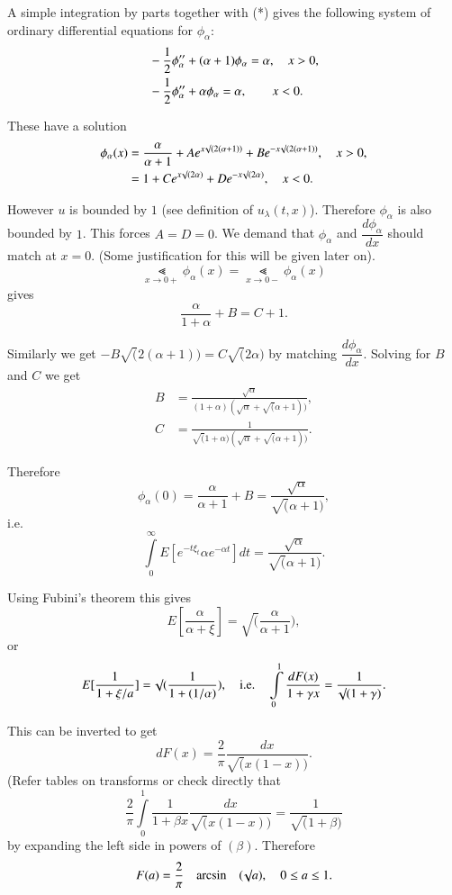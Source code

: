 A simple integration by parts together with (*) gives the following
system of ordinary differential equations for $\phi_{\alpha}$:
\begin{align*}
& -\frac{1}{2}\phi''_{\alpha}+(\alpha+1)\phi_{\alpha}=\alpha,\quad x>0,\\
&-\frac{1}{2}\phi''_{\alpha}+\alpha\phi_{\alpha}=\alpha,\qquad x<0.
\end{align*}

These have a solution 
\begin{align*}
\phi_{\alpha}(x)
&=\frac{\alpha}{\alpha+1}+Ae^{x\surd(2(\alpha+1))}+Be^{-x\surd(2(\alpha+1))},\quad
x>0,\\
&= 1+Ce^{x\surd(2\alpha)}+De^{-x\surd(2\alpha)},\quad x<0.
\end{align*}\pageoriginale

However $u$ is bounded by $1$ (see definition of
$u_{\lambda}(t,x)$). Therefore $\phi_{\alpha}$ is also bounded by
$1$. This forces $A=D=0$. We demand that $\phi_{\alpha}$ and
$\dfrac{d\phi_{\alpha}}{dx}$ should match at $x=0$. (Some
justification for this will be given later on).
$$
\Lt\limits_{x\to 0+}\phi_{\alpha}(x)=\Lt\limits_{x\to
  0-}\phi_{\alpha}(x)
$$
gives 
$$
\frac{\alpha}{1+\alpha}+B=C+1.
$$

Similarly we get $-B\surd (2(\alpha+1))=C\surd(2\alpha)$ by matching
$\dfrac{d\phi_{\alpha}}{dx}$. Solving for $B$ and $C$ we get
\begin{align*}
B &=
\frac{\surd\alpha}{(1+\alpha)(\surd\alpha+\surd(\alpha+1))},\\[4pt]
C &= \frac{1}{\surd(1+\alpha)(\surd\alpha+\surd(\alpha+1))}.
\end{align*}

Therefore
$$
\phi_{\alpha}(0)=\frac{\alpha}{\alpha+1}+B=\frac{\surd\alpha}{\surd(\alpha+1)},
$$
i.e.
$$
\int\limits^{\infty}_{0}E[e^{-t\xi_{t}}\alpha e^{-\alpha
    t}]dt=\frac{\surd\alpha}{\surd(\alpha+1)}. 
$$

Using Fubini's theorem this gives
$$
E[\frac{\alpha}{\alpha+\xi}]=\surd(\frac{\alpha}{\alpha+1}),
$$
or 
$$
E[\frac{1}{1+\xi/a}]=\surd(\frac{1}{1+(1/\alpha)}),\quad\text{i.e.}\quad
\int\limits^{1}_{0}\frac{dF(x)}{1+\gamma x}=\frac{1}{\surd
  (1+\gamma)}.
$$\pageoriginale

This can be inverted to get
$$
dF(x)=\frac{2}{\pi}\frac{dx}{\surd(x(1-x))}.
$$
(Refer tables on transforms or check directly that
$$
\frac{2}{\pi}\int\limits^{1}_{0}\frac{1}{1+\beta
  x}\frac{dx}{\surd(x(1-x))}=\frac{1}{\surd(1+\beta)}
$$
by expanding the left side in powers of $(\beta)$. Therefore
$$
F(a)=\frac{2}{\pi}\quad\text{arcsin}\quad(\surd a),\quad 0\leq a\leq 1.
$$

